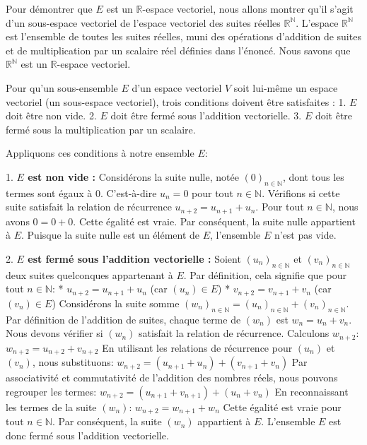 \documentclass{report}
\begin{document}
Pour démontrer que $E$ est un $\mathbb{R}$-espace vectoriel, nous allons montrer qu'il s'agit d'un sous-espace vectoriel de l'espace vectoriel des suites réelles $\mathbb{R}^{\mathbb{N}}$. L'espace $\mathbb{R}^{\mathbb{N}}$ est l'ensemble de toutes les suites réelles, muni des opérations d'addition de suites et de multiplication par un scalaire réel définies dans l'énoncé. Nous savons que $\mathbb{R}^{\mathbb{N}}$ est un $\mathbb{R}$-espace vectoriel.

Pour qu'un sous-ensemble $E$ d'un espace vectoriel $V$ soit lui-même un espace vectoriel (un sous-espace vectoriel), trois conditions doivent être satisfaites :
1.  $E$ doit être non vide.
2.  $E$ doit être fermé sous l'addition vectorielle.
3.  $E$ doit être fermé sous la multiplication par un scalaire.

Appliquons ces conditions à notre ensemble $E$:

1.  \textbf{$E$ est non vide :}
    Considérons la suite nulle, notée $(0)_{n \in \mathbb{N}}$, dont tous les termes sont égaux à 0. C'est-à-dire $u_n = 0$ pour tout $n \in \mathbb{N}$.
    Vérifions si cette suite satisfait la relation de récurrence $u_{n+2} = u_{n+1} + u_n$.
    Pour tout $n \in \mathbb{N}$, nous avons $0 = 0 + 0$.
    Cette égalité est vraie. Par conséquent, la suite nulle appartient à $E$.
    Puisque la suite nulle est un élément de $E$, l'ensemble $E$ n'est pas vide.

2.  \textbf{$E$ est fermé sous l'addition vectorielle :}
    Soient $(u_n)_{n \in \mathbb{N}}$ et $(v_n)_{n \in \mathbb{N}}$ deux suites quelconques appartenant à $E$.
    Par définition, cela signifie que pour tout $n \in \mathbb{N}$:
    *   $u_{n+2} = u_{n+1} + u_n$ (car $(u_n) \in E$)
    *   $v_{n+2} = v_{n+1} + v_n$ (car $(v_n) \in E$)
    Considérons la suite somme $(w_n)_{n \in \mathbb{N}} = (u_n)_{n \in \mathbb{N}} + (v_n)_{n \in \mathbb{N}}$. Par définition de l'addition de suites, chaque terme de $(w_n)$ est $w_n = u_n + v_n$.
    Nous devons vérifier si $(w_n)$ satisfait la relation de récurrence. Calculons $w_{n+2}$:
    $w_{n+2} = u_{n+2} + v_{n+2}$
    En utilisant les relations de récurrence pour $(u_n)$ et $(v_n)$, nous substituons:
    $w_{n+2} = (u_{n+1} + u_n) + (v_{n+1} + v_n)$
    Par associativité et commutativité de l'addition des nombres réels, nous pouvons regrouper les termes:
    $w_{n+2} = (u_{n+1} + v_{n+1}) + (u_n + v_n)$
    En reconnaissant les termes de la suite $(w_n)$:
    $w_{n+2} = w_{n+1} + w_n$
    Cette égalité est vraie pour tout $n \in \mathbb{N}$. Par conséquent, la suite $(w_n)$ appartient à $E$.
    L'ensemble $E$ est donc fermé sous l'addition vectorielle.
\end{document}

